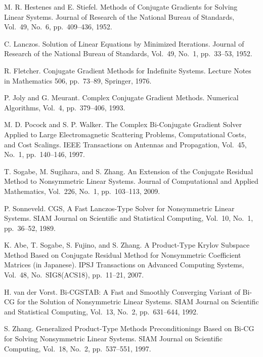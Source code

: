 \documentclass[a4paper]{jarticle}
\begin{document}
{{\begin{thebibliography}{10}
M. R. Hestenes and E. Stiefel.
\newblock Methods of Conjugate Gradients for Solving Linear Systems.
\newblock Journal of Research of the National Bureau of Standards, Vol.~49, No.~6, pp.\ 409--436, 1952.

C. Lanczos.
\newblock Solution of Linear Equations by Minimized Iterations.
\newblock Journal of Research of the National Bureau of Standards, Vol.~49, No.~1, pp.\ 33--53, 1952.

R. Fletcher.
\newblock Conjugate Gradient Methods for Indefinite Systems.
\newblock Lecture Notes in Mathematics 506, pp.\ 73--89, Springer, 1976.

P. Joly and G. Meurant.
\newblock Complex Conjugate Gradient Methods.
\newblock Numerical Algorithms, Vol.~4, pp.\ 379--406, 1993.

M. D. Pocock and S. P. Walker.
\newblock The Complex Bi-Conjugate Gradient Solver Applied to Large Electromagnetic Scattering Problems, Computational Costs, and Cost Scalings.
\newblock IEEE Transactions on Antennas and Propagation, Vol.~45, No.~1, pp.\ 140--146, 1997.

T. Sogabe, M. Sugihara, and S. Zhang.
\newblock An Extension of the Conjugate Residual Method to Nonsymmetric Linear Systems.
\newblock Journal of Computational and Applied Mathematics, Vol.~226, No.~1, pp.\ 103--113, 2009.

P. Sonneveld.
\newblock CGS, A Fast Lanczos-Type Solver for Nonsymmetric Linear Systems.
\newblock SIAM Journal on Scientific and Statistical Computing, Vol.~10, No.~1, pp.\ 36--52, 1989.

K. Abe, T. Sogabe, S. Fujino, and S. Zhang.
\newblock A Product-Type Krylov Subspace Method Based on Conjugate Residual Method for Nonsymmetric Coefficient Matrices (in Japanese).
\newblock IPSJ Transactions on Advanced Computing Systems,  Vol.~48, No.~SIG8(ACS18), pp.\ 11--21, 2007.

H. van der Vorst.
\newblock Bi-CGSTAB: A Fast and Smoothly Converging Variant of Bi-CG for
	the Solution of Nonsymmetric Linear Systems.
\newblock SIAM Journal on Scientific and Statistical Computing, Vol.~13, No.~2, pp.\ 631--644, 1992.

S. Zhang.
\newblock Generalized Product-Type Methods Preconditionings Based on
	Bi-CG for Solving Nonsymmetric Linear Systems.
\newblock SIAM Journal on Scientific Computing, Vol.~18, No.~2, pp.\ 537--551, 1997. 


\end{thebibliography}}}
\end{document}
